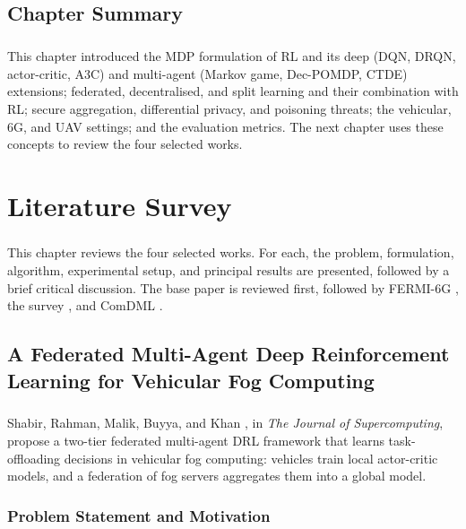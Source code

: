 \documentclass[12pt,a4paper,final]{extreport}
\begin{document}
\section{Chapter Summary}

\paragraph{} This chapter introduced the MDP formulation of RL and its deep (DQN, DRQN, actor-critic, A3C) and multi-agent (Markov game, Dec-POMDP, CTDE) extensions; federated, decentralised, and split learning and their combination with RL; secure aggregation, differential privacy, and poisoning threats; the vehicular, 6G, and UAV settings; and the evaluation metrics. The next chapter uses these concepts to review the four selected works.

\chapter{Literature Survey}

\paragraph{} This chapter reviews the four selected works. For each, the problem, formulation, algorithm, experimental setup, and principal results are presented, followed by a brief critical discussion. The base paper \cite{p1} is reviewed first, followed by FERMI-6G \cite{p2}, the survey \cite{p3}, and ComDML \cite{p4}.

\section{A Federated Multi-Agent Deep Reinforcement Learning for Vehicular Fog Computing}

\paragraph{} Shabir, Rahman, Malik, Buyya, and Khan \cite{p1}, in \textit{The Journal of Supercomputing}, propose a two-tier federated multi-agent DRL framework that learns task-offloading decisions in vehicular fog computing: vehicles train local actor-critic models, and a federation of fog servers aggregates them into a global model.

\subsection{Problem Statement and Motivation}
\end{document}
